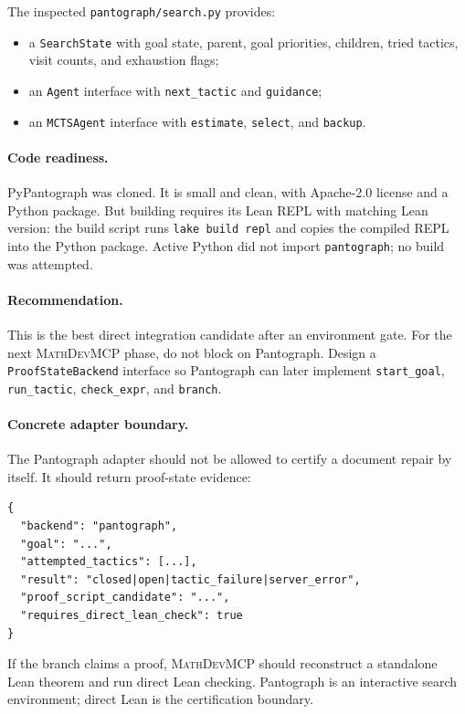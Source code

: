 \documentclass[11pt]{article}
\newcommand{\MathDevMCP}{\textsc{MathDevMCP}}
\begin{document}
The inspected \texttt{pantograph/search.py} provides:

\begin{itemize}[leftmargin=*]
\item a \texttt{SearchState} with goal state, parent, goal priorities,
  children, tried tactics, visit counts, and exhaustion flags;
\item an \texttt{Agent} interface with \texttt{next\_tactic} and
  \texttt{guidance};
\item an \texttt{MCTSAgent} interface with \texttt{estimate}, \texttt{select},
  and \texttt{backup}.
\end{itemize}

\paragraph{Code readiness.}
PyPantograph was cloned. It is small and clean, with Apache-2.0 license and a
Python package. But building requires its Lean REPL with matching Lean version:
the build script runs \texttt{lake build repl} and copies the compiled REPL into
the Python package. Active Python did not import \texttt{pantograph}; no build
was attempted.

\paragraph{Recommendation.}
This is the best direct integration candidate after an environment gate. For
the next \MathDevMCP{} phase, do not block on Pantograph. Design a
\texttt{ProofStateBackend} interface so Pantograph can later implement
\texttt{start\_goal}, \texttt{run\_tactic}, \texttt{check\_expr}, and
\texttt{branch}.

\paragraph{Concrete adapter boundary.}
The Pantograph adapter should not be allowed to certify a document repair by
itself. It should return proof-state evidence:

\begin{verbatim}
{
  "backend": "pantograph",
  "goal": "...",
  "attempted_tactics": [...],
  "result": "closed|open|tactic_failure|server_error",
  "proof_script_candidate": "...",
  "requires_direct_lean_check": true
}
\end{verbatim}

If the branch claims a proof, \MathDevMCP{} should reconstruct a standalone
Lean theorem and run direct Lean checking. Pantograph is an interactive search
environment; direct Lean is the certification boundary.
\end{document}
